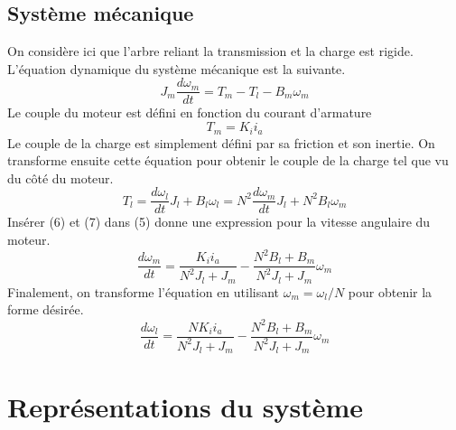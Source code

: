 \documentclass{udes_rapport} %
\begin{document}
\subsection{Système mécanique}
On considère ici que l'arbre reliant la transmission et la charge est rigide.
L'équation dynamique du système mécanique est la suivante.
\begin{equation}
J_m\frac{d\omega_m}{dt} = T_m - T_l - B_m\omega_m
\end{equation}
Le couple du moteur est défini en fonction du courant d'armature
\begin{equation}
T_m = K_ii_a
\end{equation}
Le couple de la charge est simplement défini par sa friction et son inertie. On transforme ensuite cette équation pour obtenir le couple de la charge 
tel que vu du côté du moteur.
\begin{equation}
T_l = \frac{d\omega_l}{dt}J_l + B_l\omega_l = N^2\frac{d\omega_m}{dt}J_l + N^2B_l\omega_m
\end{equation} 
Insérer (6) et (7) dans (5) donne une expression pour la vitesse angulaire du moteur.
\[ \frac{d\omega_m}{dt} = \frac{K_ii_a}{N^2J_l + J_m} - \frac{N^2B_l + B_m}{N^2J_l + J_m}\omega_m \]
Finalement, on transforme l'équation en utilisant $\omega_m = \omega_l/N$ pour obtenir la forme désirée.
\begin{equation}
\frac{d\omega_l}{dt} = \frac{NK_ii_a}{N^2J_l + J_m} - \frac{N^2B_l + B_m}{N^2J_l + J_m}\omega_m
\end{equation} 

\section{Représentations du système}
\end{document}
